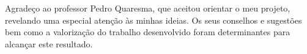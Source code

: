
\begin{acknowledgements}


Agradeço ao professor Pedro Quaresma, que aceitou orientar o meu projeto, revelando uma especial atenção às minhas ideias. Os seus conselhos e sugestões bem como a valorização do trabalho desenvolvido foram determinantes para alcançar este resultado.


\end{acknowledgements}
